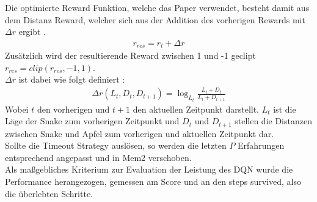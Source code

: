 Die optimierte Reward Funktion, welche das Paper verwendet, besteht damit aus dem Distanz Reward, welcher sich aus der Addition des vorherigen Rewards mit $\Delta r$ ergibt .
\begin{align}
	r_{res} = r_t + \Delta r
	\label{eq:Verwandte_Arbeiten_r}
\end{align}
Zusätzlich wird der resultierende Reward zwischen 1 und -1 geclipt $r_{res} = clip(r_{res}, -1, 1)$.\\
$\Delta r$ ist dabei wie folgt definiert :
\begin{align}
	\Delta r(L_t, D_t,D_{t+1}) = \log_{L_t}\frac{L_t + D_t}{L_t + D_{t + 1}}
	\label{eq:Verwandte_Arbeiten_Delta_r}
\end{align}
Wobei $t$ den vorherigen und $t+1$ den aktuellen Zeitpunkt darstellt. $L_t$ ist die Läge der Snake zum vorherigen Zeitpunkt und $D_t$ und $D_{t+1}$ stellen die Distanzen zwischen Snake und Apfel zum vorherigen und aktuellen Zeitpunkt dar.\\
Sollte die Timeout Strategy auslösen, so werden die letzten $P$ Erfahrungen entsprechend angepasst und in Mem2 verschoben.\\
Als maßgebliches Kriterium zur Evaluation der Leistung des DQN wurde die Performance herangezogen, gemessen am Score und an den steps survived, also die überlebten Schritte.

